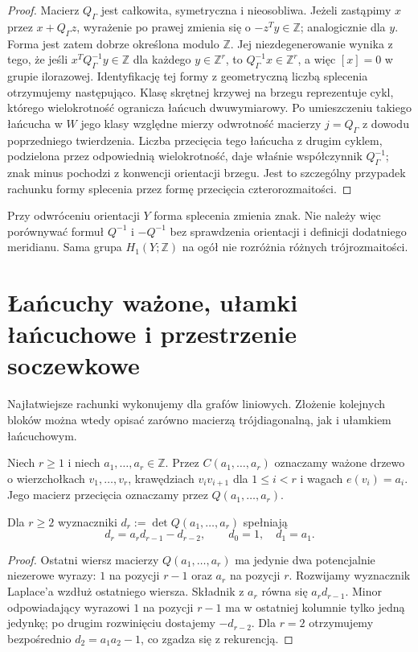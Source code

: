 \begin{proof}
Macierz $Q_\Gamma$ jest całkowita, symetryczna i nieosobliwa.
Jeżeli zastąpimy $x$ przez $x+Q_\Gamma z$, wyrażenie po prawej
zmienia się o $-z^Ty\in\mathbb Z$; analogicznie dla $y$.
Forma jest zatem dobrze określona modulo $\mathbb Z$.
Jej niezdegenerowanie wynika z tego, że jeśli
$x^TQ_\Gamma^{-1}y\in\mathbb Z$ dla każdego $y\in\mathbb Z^r$,
to $Q_\Gamma^{-1}x\in\mathbb Z^r$, a więc
$[x]=0$ w grupie ilorazowej. Identyfikację tej formy
z geometryczną liczbą splecenia otrzymujemy następująco.
Klasę skrętnej krzywej na brzegu reprezentuje cykl, którego
wielokrotność ogranicza łańcuch dwuwymiarowy.
Po umieszczeniu takiego łańcucha w $W$ jego klasy
względne mierzy odwrotność macierzy $j=Q_\Gamma$ z
dowodu poprzedniego twierdzenia. Liczba przecięcia tego
łańcucha z drugim cyklem, podzielona przez odpowiednią
wielokrotność, daje właśnie współczynnik $Q_\Gamma^{-1}$;
znak minus pochodzi z konwencji orientacji brzegu.
Jest to szczególny przypadek rachunku formy splecenia
przez formę przecięcia czterorozmaitości.
\end{proof}

\begin{uwaga}
Przy odwróceniu orientacji $Y$ forma splecenia zmienia znak.
Nie należy więc porównywać formuł $Q^{-1}$ i $-Q^{-1}$
bez sprawdzenia orientacji i definicji dodatniego meridianu.
Sama grupa $H_1(Y;\mathbb Z)$ na ogół nie rozróżnia
różnych trójrozmaitości.
\end{uwaga}

\section{Łańcuchy ważone, ułamki łańcuchowe i przestrzenie soczewkowe}
\label{sec:tg-plumbing-chains}

Najłatwiejsze rachunki wykonujemy dla grafów liniowych.
Złożenie kolejnych bloków można wtedy opisać zarówno
macierzą trójdiagonalną, jak i ułamkiem łańcuchowym.

\begin{definicja}
Niech $r\ge1$ i niech $a_1,\dots,a_r\in\mathbb Z$.
Przez $C(a_1,\dots,a_r)$ oznaczamy ważone drzewo o
wierzchołkach $v_1,\dots,v_r$, krawędziach
$v_iv_{i+1}$ dla $1\le i<r$ i wagach $e(v_i)=a_i$.
Jego macierz przecięcia oznaczamy przez $Q(a_1,\dots,a_r)$.
\end{definicja}

\begin{lemat}
Dla $r\ge2$ wyznaczniki
$d_r:=\det Q(a_1,\dots,a_r)$ spełniają
\[
d_r=a_r d_{r-1}-d_{r-2},\qquad
 d_0=1,\quad d_1=a_1.
\]
\end{lemat}
\begin{proof}
Ostatni wiersz macierzy $Q(a_1,\dots,a_r)$ ma
jedynie dwa potencjalnie niezerowe wyrazy: $1$ na pozycji
$r-1$ oraz $a_r$ na pozycji $r$. Rozwijamy wyznacznik
Laplace'a wzdłuż ostatniego wiersza. Składnik z $a_r$
równa się $a_r d_{r-1}$. Minor odpowiadający wyrazowi $1$
na pozycji $r-1$ ma w ostatniej kolumnie tylko jedną
jedynkę; po drugim rozwinięciu dostajemy $-d_{r-2}$.
Dla $r=2$ otrzymujemy bezpośrednio
$d_2=a_1a_2-1$, co zgadza się z rekurencją.
\end{proof}

